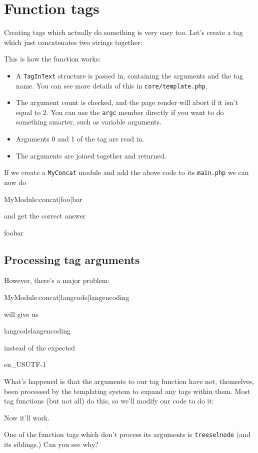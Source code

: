 \section{Function tags}
Creating tags which actually do something is very easy too. Let's create a tag
which just concatenates two strings together:
This is how the function works:
\begin{itemize}
\item A \texttt{TagInText} structure is passed in, containing the arguments and the tag name. You can see 
more details of this in \texttt{core/template.php}. 
\item The argument count is checked, and the page render will abort if it isn't equal to 2. You can use the
\texttt{argc} member directly if you want to do something smarter, such as variable arguments.
\item Arguments 0 and 1 of the tag are read in.
\item The arguments are joined together and returned.
\end{itemize}
If we create a \texttt{MyConcat} module and add the above code to its \texttt{main.php} 
we can now do
\begin{MyVerbatim}
{{MyModule:concat|foo|bar}}
\end{MyVerbatim}
and get the correct answer
\begin{MyVerbatim}
foobar
\end{MyVerbatim}
\subsection{Processing tag arguments}
However, there's a major problem:
\begin{MyVerbatim}
{{MyModule:concat|{{langcode}}|{{langencoding}}}}
\end{MyVerbatim}
will give us
\begin{MyVerbatim}
{{langcode}}{{langencoding}}
\end{MyVerbatim}
instead of the expected
\begin{MyVerbatim}
en_USUTF-1
\end{MyVerbatim}
What's happened is that the arguments to our tag function have not, themselves, been processed by the templating
system to expand any tags within them. Most tag functions (but not all) do this, so we'll modify our code to do it:
Now it'll work.

One of the function tags which don't process its arguments is \texttt{treeselnode} (and its siblings.) Can you see why?


